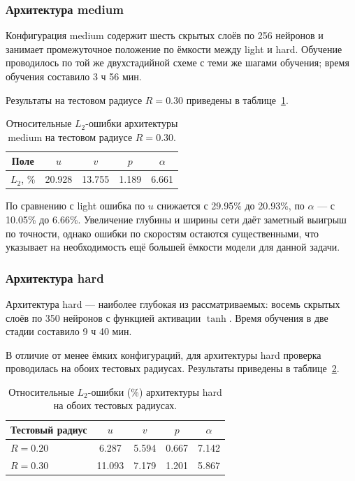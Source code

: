 \documentclass[12pt,a4paper]{article}
\begin{document}
\subsubsection{Архитектура medium}

Конфигурация medium содержит шесть скрытых слоёв по 256 нейронов и занимает
промежуточное положение по ёмкости между light и hard. Обучение проводилось
по той же двухстадийной схеме с теми же шагами обучения; время обучения
составило 3 ч 56 мин.

Результаты на тестовом радиусе \(R=0.30\) приведены в
таблице~\ref{tab:medium_errors}.

\begin{table}[H]
    \centering
    \begin{tabular}{c|cccc}
        \hline
        Поле & \(u\) & \(v\) & \(p\) & \(\alpha\) \\
        \hline
        \(L_2\), \% & 20.928 & 13.755 & 1.189 & 6.661 \\
        \hline
    \end{tabular}
    \caption{Относительные \(L_2\)-ошибки архитектуры medium на тестовом радиусе \(R=0.30\).}
    \label{tab:medium_errors}
\end{table}

По сравнению с light ошибка по \(u\) снижается с 29.95\% до 20.93\%, по
\(\alpha\) --- с 10.05\% до 6.66\%. Увеличение глубины и ширины сети даёт
заметный выигрыш по точности, однако ошибки по скоростям остаются
существенными, что указывает на необходимость ещё большей ёмкости модели
для данной задачи.

\subsubsection{Архитектура hard}

Архитектура hard --- наиболее глубокая из рассматриваемых: восемь скрытых
слоёв по 350 нейронов с функцией активации \(\tanh\). Время обучения в две
стадии составило 9 ч 40 мин.

В отличие от менее ёмких конфигураций, для архитектуры hard проверка
проводилась на обоих тестовых радиусах. Результаты приведены в
таблице~\ref{tab:hard_errors}.

\begin{table}[H]
    \centering
    \begin{tabular}{l|cccc}
        \hline
        Тестовый радиус & \(u\) & \(v\) & \(p\) & \(\alpha\) \\
        \hline
        \(R=0.20\) & 6.287 & 5.594 & 0.667 & 7.142 \\
        \(R=0.30\) & 11.093 & 7.179 & 1.201 & 5.867 \\
        \hline
    \end{tabular}
    \caption{Относительные \(L_2\)-ошибки (\%) архитектуры hard на обоих тестовых радиусах.}
    \label{tab:hard_errors}
\end{table}
\end{document}
